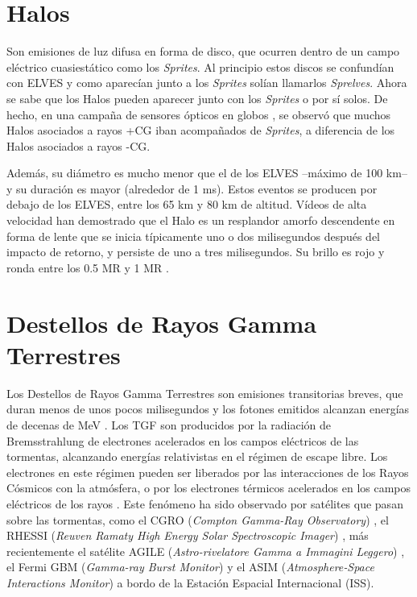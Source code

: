 \documentclass[11pt,oneside,openany,letter]{book}
\begin{document}
\section{Halos}
Son emisiones de luz difusa en forma de disco, que ocurren dentro de un campo eléctrico cuasiestático como los \textit{Sprites}. Al principio estos discos se confundían con ELVES y como aparecían junto a los \textit{Sprites} solían llamarlos \textit{Sprelves}. Ahora se sabe que los Halos pueden aparecer junto con los \textit{Sprites} o por sí solos. De hecho, en una campaña de sensores ópticos en globos \cite{BeringEtal2004}, se observó que muchos Halos asociados a rayos +CG iban acompañados de \textit{Sprites}, a diferencia de los Halos asociados a rayos -CG.

Además, su diámetro es mucho menor que el de los ELVES --máximo de 100 km-- y su duración es mayor (alrededor de 1 ms). Estos eventos se producen por debajo de los ELVES, entre los 65 km y 80 km de altitud. Vídeos de alta velocidad \cite{ArmstrongLyons2000, StanleyEtal1999, StenbaekEtal2000} han demostrado que el Halo es un resplandor amorfo descendente en forma de lente que se inicia típicamente uno o dos milisegundos después del impacto de retorno, y persiste de uno a tres milisegundos. Su brillo es rojo y ronda entre los 0.5 MR y 1 MR \cite{FullekrugEtal2006}.

\section{Destellos de Rayos Gamma Terrestres}
Los Destellos de Rayos Gamma Terrestres son emisiones transitorias breves, que duran menos de unos pocos milisegundos y los fotones emitidos alcanzan energ\'ias de decenas de MeV \cite{neubertEtal2020}. Los TGF son producidos por la radiación de Bremsstrahlung de electrones acelerados en los campos eléctricos de las tormentas, alcanzando energías relativistas en el régimen de escape libre. Los electrones en este régimen pueden ser liberados por las interacciones de los Rayos Cósmicos con la atmósfera, o por los electrones térmicos acelerados en los campos el\'ectricos de los rayos \cite{neubertEtal2020}. Este fenómeno ha sido observado por sat\'elites que pasan sobre las tormentas, como el CGRO (\textit{Compton Gamma-Ray Observatory}) \cite{FishmanEtal1994}, el RHESSI (\textit{Reuven Ramaty High Energy Solar Spectroscopic Imager}) \cite{Smith2005Etal}, m\'as recientemente el sat\'elite AGILE (\textit{Astro-rivelatore Gamma a Immagini Leggero}) \cite{MarisaldiEtal2010}, el Fermi GBM (\textit{Gamma-ray Burst Monitor}) \cite{RobertsEtal2018} y el ASIM (\textit{Atmosphere‐Space Interactions Monitor}) \cite{neubertEtal2019} a bordo de la Estaci\'on Espacial Internacional (ISS).
\end{document}
